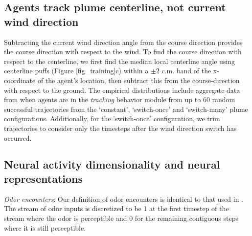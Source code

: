 \documentclass[5p,twocolumn,authoryear]{elsarticle}
\begin{document}
\subsection*{Agents track plume centerline, not current wind direction}
Subtracting the current wind direction angle from the course direction  provides the course direction with respect to the wind.
To find the course direction with respect to the centerline, we first find the median local centerline angle using centerline puffs (Figure \ref{fig_training}c) within a $\pm 2$ c.m. band of the x-coordinate of the agent's location, then subtract this from the course-direction with respect to the ground.
The empirical distributions include aggregate data from when agents are in the \textit{tracking} behavior module from up to 60 random successful trajectories from the `constant', `switch-once' and `switch-many' plume configurations.
Additionally, for the 'switch-once' configuration, we trim trajectories to consider only the timesteps after the wind direction switch has occurred. 


\subsection*{Neural activity dimensionality and neural representations}

\noindent \textit{Odor encounters}: Our definition of odor encounters is identical to that used in \cite{demir2020walking}. 
The stream of odor inputs is discretized to be 1 at the first timestep of the stream where the odor is perceptible and 0 for the remaining contiguous steps where it is still perceptible. 
\end{document}
